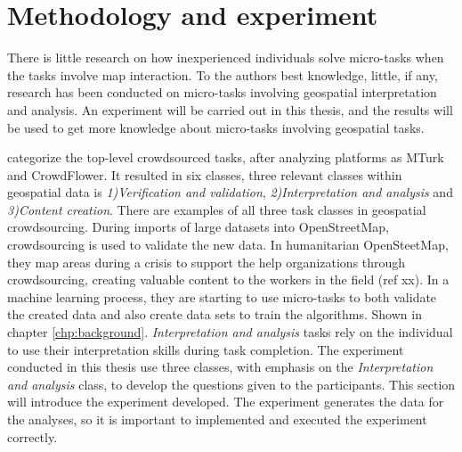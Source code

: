 \chapter{Methodology and experiment}
There is little research on how inexperienced individuals solve micro-tasks when the tasks involve map interaction. To the authors best knowledge, little, if any, research has been conducted on micro-tasks involving geospatial interpretation and analysis. An experiment will be carried out in this thesis, and the results will be used to get more knowledge about micro-tasks involving geospatial tasks. 

\cite{Gadiraju2015} categorize the top-level crowdsourced tasks, after analyzing platforms as MTurk and CrowdFlower. It resulted in six classes, three relevant classes within geospatial data is \textit{1)Verification and validation}, \textit{2)Interpretation and analysis} and \textit{3)Content creation}. There are examples of all three task classes in geospatial crowdsourcing. During imports of large datasets into OpenStreetMap, crowdsourcing is used to validate the new data. In humanitarian OpenSteetMap, they map areas during a crisis to support the help organizations through crowdsourcing, creating valuable content to the workers in the field (ref xx). In a machine learning process, they are starting to use micro-tasks to both validate the created data and also create data sets to train the algorithms. Shown in chapter \ref{chp:background}. \textit{Interpretation and analysis} tasks rely on the individual to use their interpretation skills during task completion. The experiment conducted in this thesis use \cite{Gadiraju2015} three classes, with emphasis on the \textit{Interpretation and analysis} class, to develop the questions given to the participants. This section will introduce the experiment developed. The experiment generates the data for the analyses, so it is important to implemented and executed the experiment correctly.


